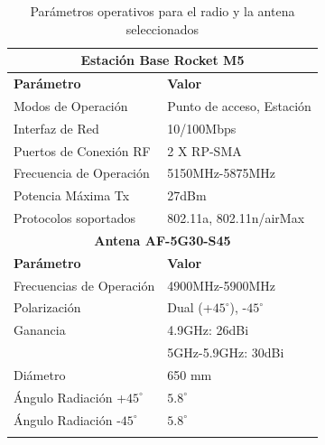 \documentclass[conference]{IEEEtran}
\begin{document}
\begin{table}[!hbt]
    \begin{center}
        \begin{tabular}{ l  l }
            \hline
            \multicolumn{2}{c}{\textbf{Estación Base Rocket M5}} \\
            \hline
            \hline
            \textbf{Parámetro} & \textbf{Valor}\\
            \hline
            Modos de Operación & Punto de acceso, Estación\\
            Interfaz de Red & 10/100Mbps \\
            Puertos de Conexión RF & 2 X RP-SMA \\
            Frecuencia de Operación & 5150MHz-5875MHz \\
            Potencia Máxima Tx & 27dBm\\
            Protocolos soportados & 802.11a, 802.11n/airMax \\
            \hline
            \multicolumn{2}{c}{\textbf{Antena AF-5G30-S45}} \\
            \hline
            \hline
            \textbf{Parámetro} & \textbf{Valor}\\
            \hline
            Frecuencias de Operación & 4900MHz-5900MHz \\
            Polarización & Dual (+$45^\circ$), -$45^\circ$\\
            Ganancia & 4.9GHz: 26dBi \\
                     & 5GHz-5.9GHz: 30dBi \\
            Diámetro & 650 mm \\
            Ángulo Radiación +$45^\circ$  & $5.8^\circ$ \\
            Ángulo Radiación -$45^\circ$  & $5.8^\circ$\\
            \hline\\
        \end{tabular}
    \caption[]{Parámetros operativos para el radio y la antena seleccionados}
    \label{Cuadro:1}
    \end{center}
\end{table}
\end{document}
